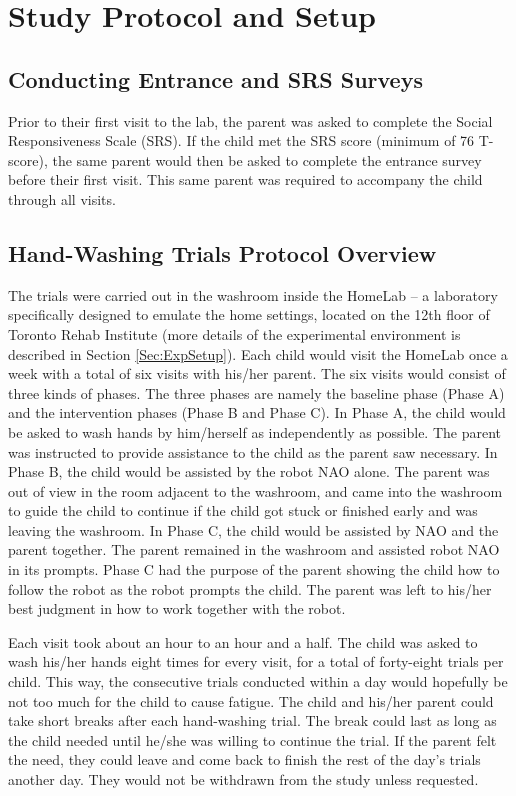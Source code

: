\documentclass{ut-thesis}
\begin{document}
\section{Study Protocol and Setup}
\label{sec:StudyProtocol}

\subsection{Conducting Entrance and SRS Surveys}
Prior to their first visit to the lab, the parent was asked to complete the Social Responsiveness Scale (SRS). If the child met the SRS score (minimum of 76 T-score), the same parent would then be asked to complete the entrance survey before their first visit. This same parent was required to accompany the child through all visits.


\subsection{Hand-Washing Trials Protocol Overview}
\label{sec:ProtocolOverview}
The trials were carried out in the washroom inside the HomeLab -- a laboratory specifically designed to emulate the home settings, located on the 12th floor of Toronto Rehab Institute (more details of the experimental environment is described in Section \ref{Sec:ExpSetup}).  Each child would visit the HomeLab once a week with a total of six visits with his/her parent. The six visits would consist of three kinds of phases. The three phases are namely the baseline phase (Phase A) and the intervention phases (Phase B and Phase C). In Phase A, the child would be asked to wash hands by him/herself as independently as possible. The parent was instructed to provide assistance to the child as the parent saw necessary.  In Phase B, the child would be assisted by the robot NAO alone.  The parent was out of view in the room adjacent to the washroom, and came into the washroom to guide the child to continue if the child got stuck or finished early and was leaving the washroom.  In Phase C, the child would be assisted by NAO and the parent together.  The parent remained in the washroom and assisted robot NAO in its prompts.  Phase C had the purpose of the parent showing the child how to follow the robot as the robot prompts the child.  The parent was left to his/her best judgment in how to work together with the robot.

Each visit took about an hour to an hour and a half. The child was asked to wash his/her hands eight times for every visit, for a total of forty-eight trials per child.  This way, the consecutive trials conducted within a day would hopefully be not too much for the child to cause fatigue.  The child and his/her parent could take short breaks after each hand-washing trial.  The break could last as long as the child needed until he/she was willing to continue the trial. If the parent felt the need, they could leave and come back to finish the rest of the day's trials another day. They would not be withdrawn from the study unless requested.
\end{document}
